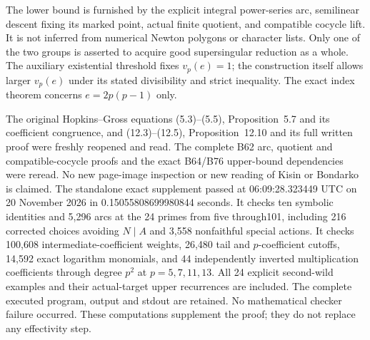 \begin{remark}
\label{rem:B-RD100-scope}
The lower bound is furnished by the explicit integral
power-series arc, semilinear descent fixing its marked
point, actual finite quotient, and compatible cocycle lift.
It is not inferred from numerical Newton polygons or
character lists. Only one of the two groups is asserted
to acquire good supersingular reduction as a whole.
The auxiliary existential threshold fixes $v_p(e)=1$;
the construction itself allows larger $v_p(e)$ under
its stated divisibility and strict inequality.
The exact index theorem concerns $e=2p(p-1)$ only.

The original Hopkins--Gross equations (5.3)--(5.5),
Proposition~5.7 and its coefficient congruence, and
(12.3)--(12.5), Proposition~12.10 and its full written
proof were freshly reopened and read. The complete B62
arc, quotient and compatible-cocycle proofs and the exact
B64/B76 upper-bound dependencies were reread.
No new page-image inspection or new reading of Kisin
or Bondarko is claimed. The standalone exact supplement
passed at 06:09:28.323449 UTC on 20 November 2026 in
0.15055808699980844 seconds. It checks ten symbolic
identities and 5,296 arcs at the 24 primes from five
through101, including 216 corrected choices avoiding
$N\mid A$ and 3,558 nonfaithful special actions.
It checks 100,608 intermediate-coefficient weights,
26,480 tail and $p$-coefficient cutoffs, 14,592 exact
logarithm monomials, and 44 independently inverted
multiplication coefficients through degree $p^2$
at $p=5,7,11,13$. All 24 explicit second-wild
examples and their actual-target upper recurrences
are included. The complete executed program, output
and stdout are retained. No mathematical checker
failure occurred. These computations supplement
the proof; they do not replace any effectivity step.
\end{remark}
